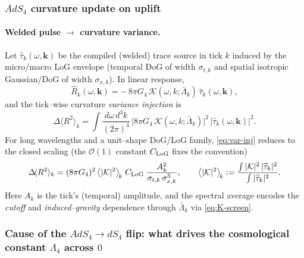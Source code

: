 \documentclass[10pt]{article}
\theoremstyle{definition}
\theoremstyle{plain}
\begin{document}
\subsubsection*{\texorpdfstring{$AdS_4$ curvature update on uplift}{AdS4 curvature update on uplift}}
\label{subsubsec:ads4-curvature-change-uplift}
\paragraph{Welded pulse $\rightarrow$ curvature variance.}\label{par:uom-main-046}
Let $\widehat{\tau}_k(\omega,\mathbf k)$ be the compiled (welded) trace source in tick $k$
induced by the micro/macro LoG envelope (temporal DoG of width $\sigma_{t,k}$ and spatial
isotropic Gaussian/DoG of width $\sigma_{x,k}$). In linear response,
\begin{equation}
\widehat{R}_k(\omega,\mathbf k)
=-\,8\pi G_4\,\mathcal K(\omega,k;\bar\Lambda_k)\,\widehat{\tau}_k(\omega,\mathbf k),
\label{eq:R-from-tau}
\end{equation}
and the tick–wise curvature \emph{variance injection} is
\begin{equation}
\Delta\!\langle R^2\rangle_k
=\int\!\frac{d\omega\,d^3k}{(2\pi)^4}\,
\big|8\pi G_4\,\mathcal K(\omega,k;\bar\Lambda_k)\big|^2\,\big|\widehat{\tau}_k(\omega,\mathbf k)\big|^2.
\label{eq:var-inj}
\end{equation}
For long wavelengths and a unit–shape DoG/LoG family, \eqref{eq:var-inj} reduces to the closed
scaling (the $\mathcal O(1)$ constant $C_{\rm LoG}$ fixes the convention)
\begin{equation}
\Delta\!\langle R^2\rangle_k
=(8\pi G_4)^2\,\big\langle|\mathcal K|^2\big\rangle_{\!k}\;
C_{\rm LoG}\;\frac{A_k^2}{\sigma_{t,k}\,\sigma_{x,k}^{3}},
\qquad
\big\langle|\mathcal K|^2\big\rangle_{\!k}
:=\frac{\int |\mathcal K|^2\,|\widehat{\tau}_k|^2}{\int |\widehat{\tau}_k|^2}.
\label{eq:variance-scaling}
\end{equation}
Here $A_k$ is the tick’s (temporal) amplitude, and the spectral average encodes the \emph{cutoff}
and \emph{induced–gravity} dependence through $\bar\Lambda_k$ via \eqref{eq:K-screen}.

\subsubsection*{\texorpdfstring{Cause of the $AdS_4 \rightarrow dS_4$ flip: what drives the cosmological constant $\Lambda_4$ across $0$}{Cause of the AdS4->dS4 flip: what drives the cosmological constant Lambda_4 across 0}}
\label{subsubsec:flip-cause}
\end{document}
